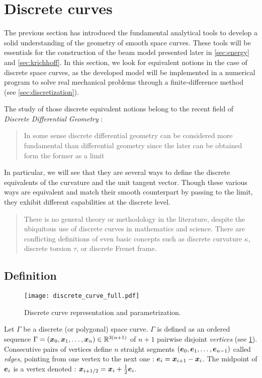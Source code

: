 \section{Discrete curves}

The previous section has introduced the fundamental analytical tools to develop a solid understanding of the geometry of smooth space curves. These tools will be essentials for the construction of the beam model presented later in \cref{sec:energy} and \cref{sec:krichhoff}. In this section, we look for equivalent notions in the case of discrete space curves, as the developed model will be implemented in a numerical program to solve real mechanical problems through a finite-difference method (see \cref{sec:discretization}).

The study of those discrete equivalent notions belong to the recent field of \emph{Discrete Differential Geometry} : \blockcquote[p.7]{Hoffmann2008}{In some sense discrete differential geometry can be considered more fundamental than differential geometry since the later can be obtained form the former as a limit}. In particular, we will see that they are several ways to define the discrete equivalents of the curvature and the unit tangent vector. Though these various ways are equivalent and match their smooth counterpart by passing to the limit, they exhibit different capabilities at the discrete level.

 \blockcquote[p.1]{Carroll2014}{There is no general theory or methodology in the literature, despite the ubiquitous use of discrete curves in mathematics and science. There are conflicting definitions of even basic concepts such as discrete curvature $\kappa$, discrete torsion $\tau$, or discrete Frenet frame.}.


\subsection{Definition}
\begin{figure}[t]
	\centering
	\texttt{[image: discrete\_curve\_full.pdf]}
	\caption{Discrete curve representation and parametrization.}
	\label{fig:discrete_curve}
\end{figure}

Let $\Gamma$ be a discrete (or polygonal) space curve. $\Gamma$ is defined as an ordered sequence $\Gamma = (\boldsymbol{x}_0,  \boldsymbol{x}_1, \ldots, \boldsymbol{x}_n) \in \mathbb{R}^{3(n+1)}$ of $n+1$ pairwise disjoint \emph{vertices} (see \cref{fig:discrete_curve}). Consecutive pairs of vertices define $n$ straight segments $(\boldsymbol{e}_0,  \boldsymbol{e}_1, \ldots, \boldsymbol{e}_{n-1})$ called \emph{edges}, pointing from one vertex to the next one : $\boldsymbol{e}_i = \boldsymbol{x}_{i+1} - \boldsymbol{x}_{i}$. The midpoint of $\boldsymbol{e}_i$ is a vertex denoted : $\boldsymbol{x}_{i+1/2} = \boldsymbol{x}_{i} + \frac{1}{2}\boldsymbol{e}_{i}$. 

